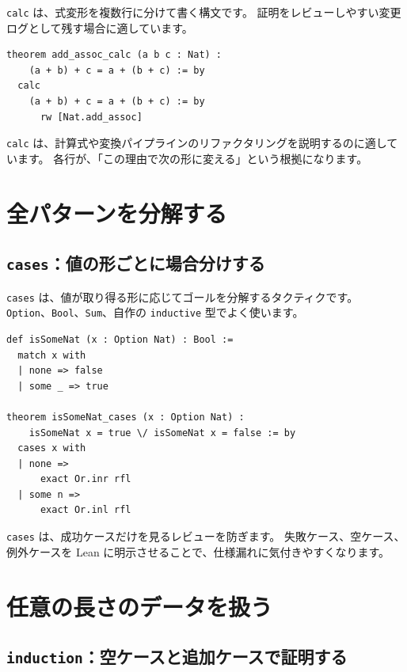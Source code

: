 \texttt{calc} は、式変形を複数行に分けて書く構文です。
証明をレビューしやすい変更ログとして残す場合に適しています。

\begin{listing}[htbp]
\begin{verbatim}
theorem add_assoc_calc (a b c : Nat) :
    (a + b) + c = a + (b + c) := by
  calc
    (a + b) + c = a + (b + c) := by
      rw [Nat.add_assoc]
\end{verbatim}
\caption{\texttt{add\_assoc\_calc}}
\label{lst:appA_calc}
\end{listing}

\texttt{calc} は、計算式や変換パイプラインのリファクタリングを説明するのに適しています。
各行が、「この理由で次の形に変える」という根拠になります。

\section{全パターンを分解する}

\subsection{\texttt{cases}：値の形ごとに場合分けする}

\texttt{cases} は、値が取り得る形に応じてゴールを分解するタクティクです。
\texttt{Option}、\texttt{Bool}、\texttt{Sum}、自作の \texttt{inductive} 型でよく使います。

\begin{listing}[htbp]
\begin{verbatim}
def isSomeNat (x : Option Nat) : Bool :=
  match x with
  | none => false
  | some _ => true

theorem isSomeNat_cases (x : Option Nat) :
    isSomeNat x = true \/ isSomeNat x = false := by
  cases x with
  | none =>
      exact Or.inr rfl
  | some n =>
      exact Or.inl rfl
\end{verbatim}
\caption{\texttt{isSomeNat\_cases}}
\label{lst:appA_cases}
\end{listing}

\texttt{cases} は、成功ケースだけを見るレビューを防ぎます。
失敗ケース、空ケース、例外ケースを Lean に明示させることで、仕様漏れに気付きやすくなります。

\section{任意の長さのデータを扱う}

\subsection{\texttt{induction}：空ケースと追加ケースで証明する}

